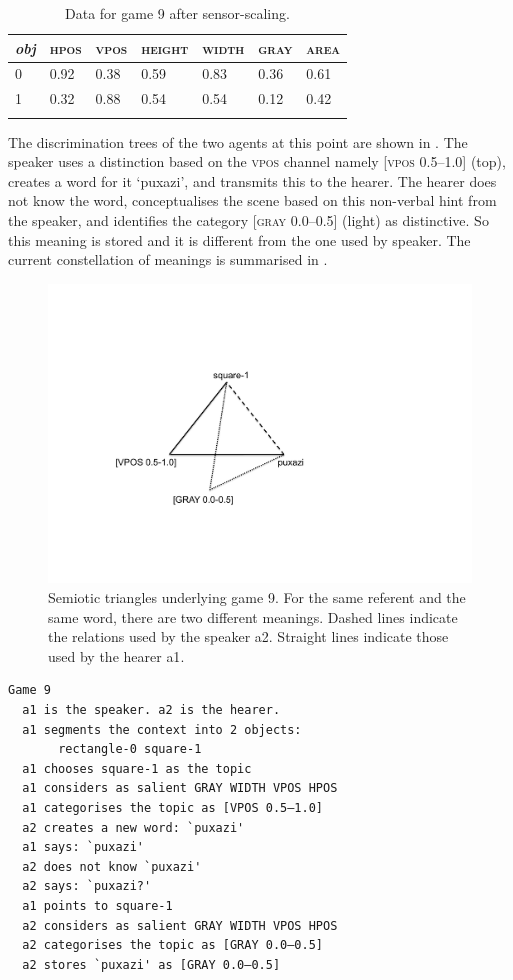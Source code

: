 \begin{table}
\begin{center}
\begin{tabular}{ l  l  l  l  l  l  l }
\lsptoprule
{\itshape obj} & \textsc{hpos} & \textsc{vpos} & \textsc{height} & \textsc{width} & \textsc{gray} & \textsc{area} \\ \midrule
0 & 0.92 & 0.38 & 0.59 & 0.83 & 0.36 & 0.61\\ 
1 & 0.32 & 0.88 & 0.54 & 0.54 & 0.12 & 0.42\\ 
\lspbottomrule
\end{tabular}
\caption{\label{tab:different}Data for game 9 after sensor-scaling.}
\end{center}
\end{table}
The discrimination trees of the two agents at this point
are shown in . 
The speaker uses a distinction based on the 
\textsc{vpos} channel namely [\textsc{vpos} 0.5–1.0] (top), creates
a word for it `puxazi', and transmits this to the hearer. 
The hearer does not know the word,
conceptualises the scene based on this non-verbal
hint from the speaker, and identifies the category
{}[\textsc{gray} 0.0–0.5] (light) as distinctive. So this 
meaning is stored and it is different from the one used by 
speaker. The current constellation of meanings
is summarised in . 

\begin{figure}[h]
	\centerline{\includegraphics[width=.45\textwidth]{chap6/figs/triangle4.pdf}}
	\caption{\label{triangle4}Semiotic triangles
		underlying game 9. For the same referent and the same word, 
		there are two different meanings. Dashed lines indicate
		the relations used by the speaker {\bfshape  a2}. Straight lines
		indicate those used by the hearer {\bfshape  a1}.}
\end{figure}

\begin{verbatim}
Game 9
  a1 is the speaker. a2 is the hearer. 
  a1 segments the context into 2 objects: 
       rectangle-0 square-1 
  a1 chooses square-1 as the topic 
  a1 considers as salient GRAY WIDTH VPOS HPOS 
  a1 categorises the topic as [VPOS 0.5–1.0]
  a2 creates a new word: `puxazi'
  a1 says: `puxazi'
  a2 does not know `puxazi'
  a2 says: `puxazi?'
  a1 points to square-1
  a2 considers as salient GRAY WIDTH VPOS HPOS
  a2 categorises the topic as [GRAY 0.0–0.5]
  a2 stores `puxazi' as [GRAY 0.0–0.5]
\end{verbatim}




